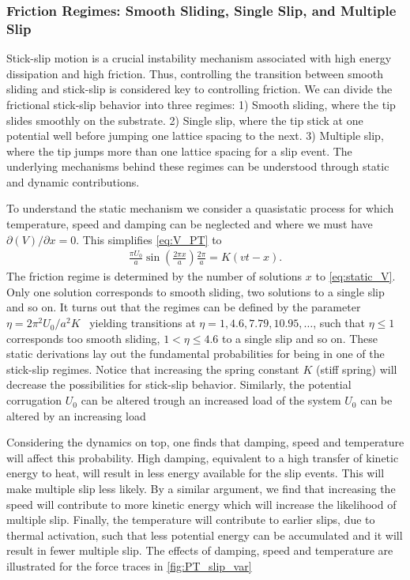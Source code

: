 \subsubsection{Friction Regimes: Smooth Sliding, Single Slip, and Multiple Slip}
Stick-slip motion is a crucial instability mechanism associated with high energy dissipation and high friction. Thus, controlling the transition between smooth sliding and stick-slip is considered key to controlling friction. We can divide the frictional stick-slip behavior into three regimes: 1) Smooth sliding, where the tip slides smoothly on the substrate. 2) Single slip, where the tip stick at one potential well before jumping one lattice spacing to the next. 3) Multiple slip, where the tip jumps more than one lattice spacing for a slip event. The underlying mechanisms behind these regimes can be understood through static and dynamic contributions. 

To understand the static mechanism we consider a quasistatic process for which temperature, speed and damping can be neglected and where we must have $\partial(V)/\partial x = 0$. This simplifies \cref{eq:V_PT} to 
\begin{align}
  \frac{\pi U_0}{a} \sin\left(\frac{2\pi x}{a}\right) \frac{2 \pi}{a} = K(vt - x).
  \label{eq:static_V}
\end{align}
The friction regime is determined by the number of solutions $x$ to \cref{eq:static_V}. Only one solution corresponds to
smooth sliding, two solutions to a single slip and so on. It turns out that the
regimes can be defined by the parameter $\eta = 2\pi^2U_0/a^2K$~\cite{Johnson_1998, Medyanik_2006} yielding transitions at $\eta = 1, 4.6, 7.79, 10.95, \hdots$, such that $\eta \le 1$
corresponds too smooth sliding, $1<\eta \le 4.6$ to a single slip and so on. These static derivations lay out the fundamental probabilities for being in one of the stick-slip regimes. Notice that increasing the spring constant $K$ (stiff spring) will decrease the possibilities for stick-slip behavior. Similarly, the potential corrugation $U_0$ can be altered trough an increased load of the system
$U_0$ can be altered by an increasing load~\cite{Vanossi_2013}


Considering the dynamics on top, one finds that damping, speed and temperature will affect this probability. High damping, equivalent to a high transfer
of kinetic energy to heat, will result in less energy available for the slip events. This will make multiple slip less likely. By a similar argument, we find that increasing the speed will contribute to more kinetic energy which will increase the likelihood of multiple slip. Finally, the temperature will contribute to earlier slips, due to thermal activation, such that
less potential energy can be accumulated and it will result in fewer multiple slip. The effects of damping, speed and temperature are illustrated for the force traces in \cref{fig:PT_slip_var}





